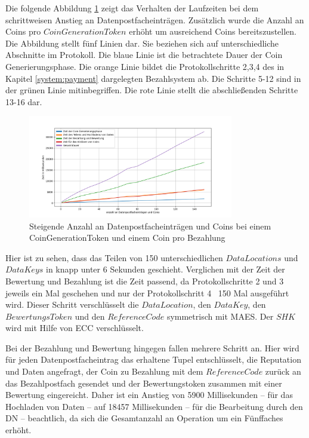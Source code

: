 \documentclass[
	fontsize=11pt,
	headings=small,
	parskip=half,           %
	bibliography=totoc,
	numbers=noenddot,       %
	open=any,               %
]{scrreprt}
\begin{document}
Die folgende Abbildung \ref{fig:win_3} zeigt das Verhalten der Laufzeiten bei dem schrittweisen Anstieg an Datenpostfacheinträgen. Zusätzlich wurde die Anzahl an Coins pro $CoinGenerationToken$ erhöht um ausreichend Coins bereitszustellen. Die Abbildung stellt fünf Linien dar. Sie beziehen sich auf unterschiedliche Abschnitte im Protokoll. Die blaue Linie ist die betrachtete Dauer der Coin Generierungsphase. Die orange Linie bildet die Protokollschritte 2,3,4 des in Kapitel \ref{system:payment} dargelegten Bezahlsystem ab. Die Schritte 5-12 sind in der grünen Linie mitinbegriffen. Die rote Linie stellt die abschließenden Schritte 13-16 dar.
\begin{figure}[H]
    \caption{Steigende Anzahl an Datenpostfacheinträgen und Coins bei einem CoinGenerationToken und einem Coin pro Bezahlung}
    \label{fig:win_3}
    \centering
    \includegraphics[width=0.8\textwidth]{figure_win_3.png}
\end{figure}
Hier ist zu sehen, dass das Teilen von 150 unterschiedlichen $DataLocations$ und $DataKeys$ in knapp unter 6 Sekunden geschieht. Verglichen mit der Zeit der Bewertung und Bezahlung ist die Zeit passend, da Protokollschritte 2 und 3 jeweils ein Mal geschehen und nur der Protokollschritt 4 \ 150 Mal ausgeführt wird. Dieser Schritt verschlüsselt die $DataLocation$, den $DataKey$, den $BewertungsToken$ und den $ReferenceCode$ symmetrisch mit MAES. Der $SHK$ wird mit Hilfe von ECC verschlüsselt.

Bei der Bezahlung und Bewertung hingegen fallen mehrere Schritt an. Hier wird für jeden Datenpostfacheintrag das erhaltene Tupel entschlüsselt, die Reputation und Daten angefragt, der Coin zu Bezahlung mit dem $ReferenceCode$ zurück an das Bezahlpostfach gesendet und der Bewertungstoken zusammen mit einer Bewertung eingereicht. Daher ist ein Anstieg von 5900 Millisekunden -- für das Hochladen von Daten -- auf 18457 Millisekunden -- für die Bearbeitung durch den DN -- beachtlich, da sich die Gesamtanzahl an Operation um ein Fünffaches erhöht.
\end{document}
